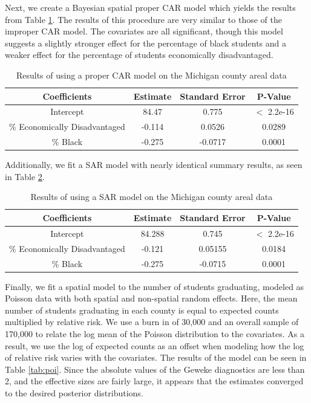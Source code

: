 \documentclass[12pt,letterpaper]{article}
\begin{document}
Next, we create a Bayesian spatial proper CAR model which yields the results from Table \ref{tab:proper_car}. The results of this procedure are very similar to those of the improper CAR model. The covariates are all significant, though this model suggests a slightly stronger effect for the percentage of black students and a weaker effect for the percentage of students economically disadvantaged. 

\begin{table}
  \caption{Results of using a proper CAR model on the Michigan county areal data} 
  \label{tab:proper_car}
  \centering 
 \begin{tabular}{||c c c c||} 
 \hline
 Coefficients & Estimate & Standard Error & P-Value\\ [0.5ex] 
 \hline\hline
 Intercept & 84.47 & 0.775 & $<$ 2.2e-16 \\ 
 \hline
 \% Economically Disadvantaged & -0.114 & 0.0526  & 0.0289 \\
 \hline
 \% Black & -0.275 & -0.0717 & 0.0001 \\[0.5ex] 
 \hline
\end{tabular}
\end{table}

Additionally, we fit a SAR model with nearly identical summary results, as seen in Table \ref{tab:sar}.

\begin{table}
  \caption{Results of using a SAR model on the Michigan county areal data} 
  \label{tab:sar}
	\centering
 \begin{tabular}{||c c c c||} 
 \hline
 Coefficients & Estimate & Standard Error & P-Value\\ [0.5ex] 
 \hline\hline
 Intercept & 84.288 & 0.745 & $<$ 2.2e-16 \\ 
 \hline
 \% Economically Disadvantaged & -0.121& 0.05155 & 0.0184 \\
 \hline
 \% Black & -0.275 & -0.0715 & 0.0001 \\[0.5ex] 
 \hline
\end{tabular}
\end{table}

Finally, we fit a spatial model to the number of students graduating, modeled as Poisson data with both spatial and non-spatial random effects. Here, the mean number of students graduating in each county is equal to expected counts multiplied by relative risk. We use a burn in of 30,000 and an overall sample of 170,000 to relate the log mean of the Poisson distribution to the covariates. As a result, we use the log of expected counts as an offset when modeling how the log of relative risk varies with the covariates. The results of the model can be seen in Table \ref{tab:poi}. Since the absolute values of the Geweke diagnostics are less than 2, and the effective sizes are fairly large, it appears that the estimates converged to the desired posterior distributions.
\end{document}
